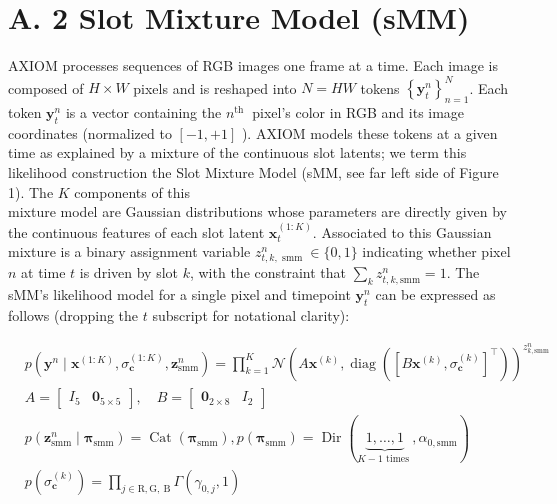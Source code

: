 \documentclass[10pt]{article}
\begin{document}
\section*{A. 2 Slot Mixture Model (sMM)}
AXIOM processes sequences of RGB images one frame at a time. Each image is composed of $H \times W$ pixels and is reshaped into $N=H W$ tokens $\left\{\mathbf{y}_{t}^{n}\right\}_{n=1}^{N}$. Each token $\mathbf{y}_{t}^{n}$ is a vector containing the $n^{\text {th }}$ pixel's color in RGB and its image coordinates (normalized to $[-1,+1]$ ). AXIOM models these tokens at a given time as explained by a mixture of the continuous slot latents; we term this likelihood construction the Slot Mixture Model (sMM, see far left side of Figure 1). The $K$ components of this\\
mixture model are Gaussian distributions whose parameters are directly given by the continuous features of each slot latent $\mathbf{x}_{t}^{(1: K)}$. Associated to this Gaussian mixture is a binary assignment variable $z_{t, k, \text { smm }}^{n} \in\{0,1\}$ indicating whether pixel $n$ at time $t$ is driven by slot $k$, with the constraint that $\sum_{k} z_{t, k, \mathrm{smm}}^{n}=1$. The sMM's likelihood model for a single pixel and timepoint $\mathbf{y}_{t}^{n}$ can be expressed as follows (dropping the $t$ subscript for notational clarity):


\begin{align*}
& p\left(\mathbf{y}^{n} \mid \mathbf{x}^{(1: K)}, \sigma_{\mathbf{c}}^{(1: K)}, \mathbf{z}_{\mathrm{smm}}^{n}\right)=\prod_{k=1}^{K} \mathcal{N}\left(A \mathbf{x}^{(k)}, \operatorname{diag}\left(\left[B \mathbf{x}^{(k)}, \sigma_{\mathbf{c}}^{(k)}\right]^{\top}\right)\right)^{z_{k, \mathrm{smm}}^{n}}  \tag{12}\\
& A=\left[\begin{array}{ll}
I_{5} & \mathbf{0}_{5 \times 5}
\end{array}\right], \quad B=\left[\begin{array}{ll}
\mathbf{0}_{2 \times 8} & I_{2}
\end{array}\right]  \tag{13}\\
& p\left(\mathbf{z}_{\mathrm{smm}}^{n} \mid \boldsymbol{\pi}_{\mathrm{smm}}\right)=\operatorname{Cat}\left(\boldsymbol{\pi}_{\mathrm{smm}}\right), p\left(\boldsymbol{\pi}_{\mathrm{smm}}\right)=\operatorname{Dir}(\underbrace{1, \ldots, 1}_{K-1 \text { times }}, \alpha_{0, \mathrm{smm}})  \tag{14}\\
& p\left(\sigma_{\mathbf{c}}^{(k)}\right)=\prod_{j \in \mathrm{R}, \mathrm{G}, \mathrm{~B}} \Gamma\left(\gamma_{0, j}, 1\right) \tag{15}
\end{align*}
\end{document}
